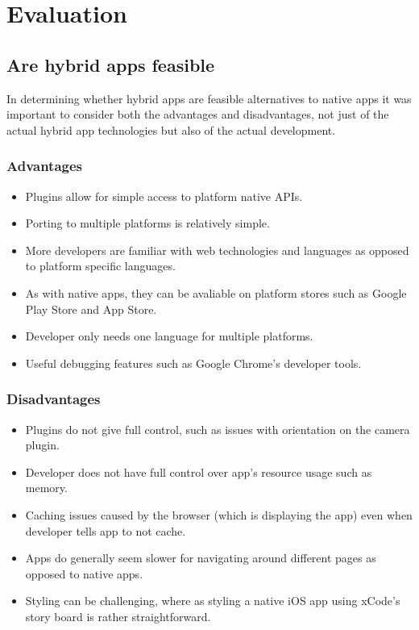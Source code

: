 \chapter{Evaluation}

\section{Are hybrid apps feasible}
In determining whether hybrid apps are feasible alternatives to native apps it was important to consider both the advantages and disadvantages, not just of the actual hybrid app technologies but also of the actual development.

\subsection{Advantages}
\begin{itemize}
	\item Plugins allow for simple access to platform native APIs.
	\item Porting to multiple platforms is relatively simple.
	\item More developers are familiar with web technologies and languages as opposed to platform specific languages.
	\item As with native apps, they can be avaliable on platform stores such as Google Play Store and App Store.
	\item Developer only needs one language for multiple platforms.
	\item Useful debugging features such as Google Chrome's developer tools.
\end{itemize}
\subsection{Disadvantages}
\begin{itemize}
    \item Plugins do not give full control, such as issues with orientation on the camera plugin.
    \item Developer does not have full control over app's resource usage such as memory.
    \item Caching issues caused by the browser (which is displaying the app) even when developer tells app to not cache.
    \item Apps do generally seem slower for navigating around different pages as opposed to native apps. 
    \item Styling can be challenging, where as styling a native iOS app using xCode's story board is rather straightforward.

\end{itemize}
